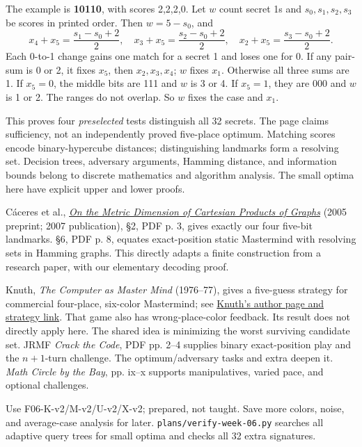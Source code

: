 \documentclass[11pt]{article}
\begin{document}
\newpage
{}
The example is \textbf{10110}, with scores 2,2,2,0. Let \(w\) count secret 1s and \(s_0,s_1,s_2,s_3\) be scores in printed order. Then \(w=5-s_0\), and
\[
x_4+x_5=\frac{s_1-s_0+2}{2},\quad x_3+x_5=\frac{s_2-s_0+2}{2},\quad x_2+x_5=\frac{s_3-s_0+2}{2}.
\]
Each 0-to-1 change gains one match for a secret 1 and loses one for 0. If any pair-sum is 0 or 2, it fixes \(x_5\), then \(x_2,x_3,x_4\); \(w\) fixes \(x_1\). Otherwise all three sums are 1. If \(x_5=0\), the middle bits are 111 and \(w\) is 3 or 4. If \(x_5=1\), they are 000 and \(w\) is 1 or 2. The ranges do not overlap. So \(w\) fixes the case and \(x_1\).

This proves four \emph{preselected} tests distinguish all 32 secrets. The page claims sufficiency, not an independently proved five-place optimum. Matching scores encode binary-hypercube distances; distinguishing landmarks form a resolving set.
Decision trees, adversary arguments, Hamming distance, and information bounds belong to discrete mathematics and algorithm analysis. The small optima here have explicit upper and lower proofs.

C\'aceres et al., \href{https://users.monash.edu.au/~davidwo/papers/MetricDimension-arXiv.pdf}{\emph{On the Metric Dimension of Cartesian Products of Graphs}} (2005 preprint; 2007 publication), \S2, PDF p. 3, gives exactly our four five-bit landmarks. \S6, PDF p. 8, equates exact-position static Mastermind with resolving sets in Hamming graphs. This directly adapts a finite construction from a research paper, with our elementary decoding proof.

Knuth, \emph{The Computer as Master Mind} (1976--77), gives a five-guess strategy for commercial four-place, six-color Mastermind; see \href{https://cs.stanford.edu/~knuth/fg.html}{Knuth's author page and strategy link}. That game also has wrong-place-color feedback. Its result does not directly apply here. The shared idea is minimizing the worst surviving candidate set.
JRMF \emph{Crack the Code}, PDF pp. 2--4 supplies binary exact-position play and the \(n+1\)-turn challenge. The optimum/adversary tasks and extra deepen it. \emph{Math Circle by the Bay}, pp. ix--x supports manipulatives, varied pace, and optional challenges.

Use F06-K-v2/M-v2/U-v2/X-v2; prepared, not taught. Save more colors, noise, and average-case analysis for later. \texttt{plans/verify-week-06.py} searches all adaptive query trees for small optima and checks all 32 extra signatures.
\end{document}
